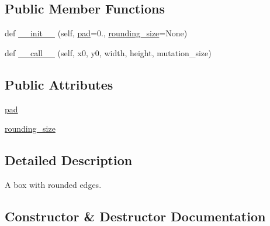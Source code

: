 \subsection*{Public Member Functions}
\begin{DoxyCompactItemize}
\item 
def \hyperlink{classmatplotlib_1_1patches_1_1BoxStyle_1_1Round4_a05859e72eff42ea31d82275b2a155249}{\+\_\+\+\_\+init\+\_\+\+\_\+} (self, \hyperlink{classmatplotlib_1_1patches_1_1BoxStyle_1_1Round4_ab68d9131e454b575c5d4a18bdb3a412f}{pad}=0., \hyperlink{classmatplotlib_1_1patches_1_1BoxStyle_1_1Round4_aca0b54622d4f57475aa70ea48ba7498f}{rounding\+\_\+size}=None)
\item 
def \hyperlink{classmatplotlib_1_1patches_1_1BoxStyle_1_1Round4_ac0624cabb04a379265bd6e0ae83aa7ef}{\+\_\+\+\_\+call\+\_\+\+\_\+} (self, x0, y0, width, height, mutation\+\_\+size)
\end{DoxyCompactItemize}
\subsection*{Public Attributes}
\begin{DoxyCompactItemize}
\item 
\hyperlink{classmatplotlib_1_1patches_1_1BoxStyle_1_1Round4_ab68d9131e454b575c5d4a18bdb3a412f}{pad}
\item 
\hyperlink{classmatplotlib_1_1patches_1_1BoxStyle_1_1Round4_aca0b54622d4f57475aa70ea48ba7498f}{rounding\+\_\+size}
\end{DoxyCompactItemize}


\subsection{Detailed Description}
\begin{DoxyVerb}A box with rounded edges.\end{DoxyVerb}
 

\subsection{Constructor \& Destructor Documentation}
\mbox{\label{classmatplotlib_1_1patches_1_1BoxStyle_1_1Round4_a05859e72eff42ea31d82275b2a155249}} 
